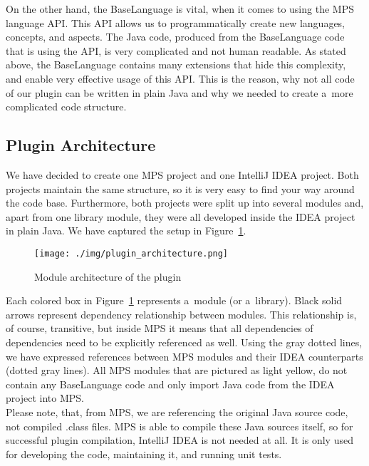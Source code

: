 On the other hand, the BaseLanguage is vital, when it comes to using the MPS language API.
This API allows us to programmatically create new languages, concepts, and aspects.
The Java code, produced from the BaseLanguage code that is using the API, is very complicated and not human readable.
As stated above, the BaseLanguage contains many extensions that hide this complexity, and enable very effective usage of this API.
This is the reason, why not all code of our plugin can be written in plain Java and why we needed to create a~more complicated code structure.

\subsection{Plugin Architecture}

We have decided to create one MPS project and one IntelliJ IDEA project.
Both projects maintain the same structure, so it is very easy to find your way around the code base.
Furthermore, both projects were split up into several modules and, apart from one library module, they were all developed inside the IDEA project in plain Java.
We have captured the setup in Figure~\ref{fig:plugin_architecture}.

\begin{figure}[ht]
	\centering
	\texttt{[image: ./img/plugin\_architecture.png]}
	\caption{Module architecture of the plugin}
	\label{fig:plugin_architecture}
\end{figure}

Each colored box in Figure~\ref{fig:plugin_architecture} represents a~module (or a~library).
Black solid arrows represent dependency relationship between modules.
This relationship is, of course, transitive, but inside MPS it means that all dependencies of dependencies need to be explicitly referenced as well.
Using the gray dotted lines, we have expressed references between MPS modules and their IDEA counterparts (dotted gray lines).
All MPS modules that are pictured as light yellow, do not contain any BaseLanguage code and only import Java code from the IDEA project into MPS.
\\

Please note, that, from MPS, we are referencing the original Java source code, not compiled .class files.
MPS is able to compile these Java sources itself, so for successful plugin compilation, IntelliJ IDEA is not needed at all.
It is only used for developing the code, maintaining it, and running unit tests.


